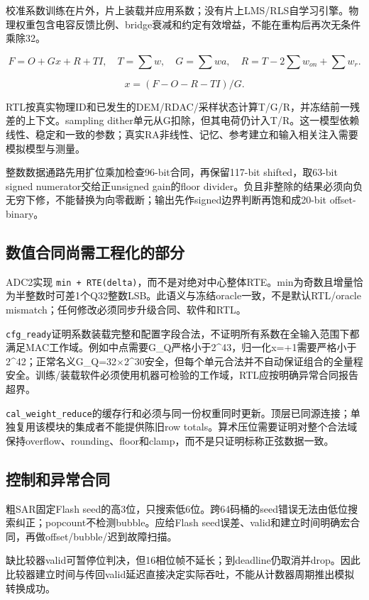 \documentclass[UTF8,fontset=fandol,10pt,a4paper,openany]{ctexrep}
\newcommand{\code}[1]{\nolinkurl{#1}}
\begin{document}
校准系数训练在片外，片上装载并应用系数；没有片上LMS/RLS自学习引擎。物理权重包含电容反馈比例、bridge衰减和约定有效增益，不能在重构后再次无条件乘除32。


\[F=O+Gx+R+TI,\quad T=\sum w,\quad G=\sum wa,\quad R=T-2\sum w_{on}+\sum w_r.\]


\[x=(F-O-R-TI)/G.\]


RTL按真实物理ID和已发生的DEM/RDAC/采样状态计算T/G/R，并冻结前一残差的上下文。sampling dither单元从G扣除，但其电荷仍计入T/R。这一模型依赖线性、稳定和一致的参数；真实RA非线性、记忆、参考建立和输入相关注入需要模拟模型与测量。


整数数据通路先用扩位乘加检查96-bit合同，再保留117-bit shifted，取63-bit signed numerator交给正unsigned gain的floor divider。负且非整除的结果必须向负无穷下修，不能替换为向零截断；输出先作signed边界判断再饱和成20-bit offset-binary。


\subsection{数值合同尚需工程化的部分}


ADC2实现 \code{min + RTE(delta)}，而不是对绝对中心整体RTE。min为奇数且增量恰为半整数时可差1个Q32整数LSB。此语义与冻结oracle一致，不是默认RTL/oracle mismatch；任何修改必须同步升级合同、软件和RTL。


\code{cfg_ready}证明系数装载完整和配置字段合法，不证明所有系数在全输入范围下都满足MAC工作域。例如中点需要G\_Q严格小于2\textasciicircum{}43，归一化x=+1需要严格小于2\textasciicircum{}42；正常名义G\_Q=32\ensuremath{\times}2\textasciicircum{}30安全，但每个单元合法并不自动保证组合的全量程安全。训练/装载软件必须使用机器可检验的工作域，RTL应按明确异常合同报告超界。


\code{cal_weight_reduce}的缓存行和必须与同一份权重同时更新。顶层已同源连接；单独复用该模块的集成者不能提供陈旧row totals。算术压位需要证明对整个合法域保持overflow、rounding、floor和clamp，而不是只证明标称正弦数据一致。


\subsection{控制和异常合同}


粗SAR固定Flash seed的高3位，只搜索低6位。跨64码桶的seed错误无法由低位搜索纠正；popcount不检测bubble。应给Flash seed误差、valid和建立时间明确宏合同，再做offset/bubble/迟到故障扫描。


缺比较器valid可暂停位判决，但16相位帧不延长；到deadline仍取消并drop。因此比较器建立时间与传回valid延迟直接决定实际吞吐，不能从计数器周期推出模拟转换成功。
\end{document}
